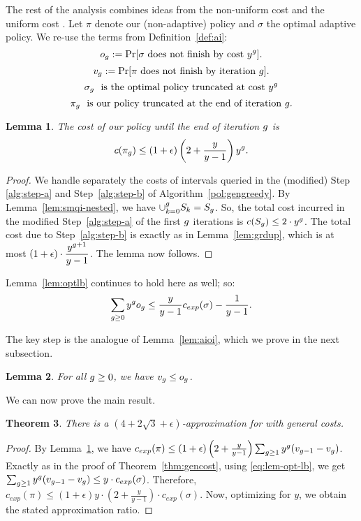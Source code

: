 \documentclass[11pt]{article}
\newcommand{\base}{y}
\newtheorem{thm}{Theorem}[section]
\newtheorem{lem}[thm]{Lemma}
\theoremstyle{remark}
\theoremstyle{plain}
\theoremstyle{remark}
\begin{document}
The rest of the analysis combines ideas from the non-uniform cost \smq and the uniform cost \smqi. Let $\pi$ denote our (non-adaptive) policy and $\sigma$ the optimal adaptive policy. We re-use the terms from Definition~\ref{def:ai}: 
  \[ o_\i := \Pr[ \sigma \text{ does not finish by cost }\base^\i] . \]
    \[ v_g := \Pr[\pi \text{ does not finish by iteration }g] .\]
    \[\sigma_\i \,\,  \text{ is the optimal policy truncated at cost }\base^\i\]
    \[\pi_g \,\,  \text{ is our policy truncated at the end of iteration  } g.\]

    
\begin{lem}
\label{lem:smqi-cost-i}The cost of our policy until the end of iteration $g$  is
   \[c(\pi_\i)  \leq (1 + \epsilon) \left(2 + \dfrac{\base}{\base - 1}  \right)\base^\i. \]
\end{lem}
\begin{proof}
We handle separately the costs of intervals queried in the (modified) Step \ref{alg:step-a}   and Step~\ref{alg:step-b} of Algorithm~\ref{pol:gengreedy}. By Lemma~\ref{lem:smqi-nested}, we have $\cup_{k=0}^g S_k =S_g$. So,  the total cost incurred in the modified Step~\ref{alg:step-a} of the first $g$ iterations is $c(\t_\i)\le 2\cdot \base^\i$. The total cost due to Step~\ref{alg:step-b} is exactly as in Lemma~\ref{lem:grdup}, which is at most $ (1 + \epsilon) \cdot \dfrac{\base^{\i+1}}{\base - 1}$.   The lemma now follows. 
\end{proof}
Lemma~\ref{lem:optlb} continues to hold here as well; so:
\begin{equation}
    \label{eq:lem-opt-lb}
    \sum_{\i\ge 0} {\base^\i o_\i} \leq  \frac{\base }{\base-1} c_{exp}(\sigma) - \frac1{y-1}. 
\end{equation}

The key step is the analogue of Lemma~\ref{lem:aioi}, which we prove in the next subsection.
 \begin{lem} For all $g \ge 0$, we have $v_g \le o_g$. 
 \label{lem:smqi-comp-prob}
 \end{lem}

We can now prove the main result. 
\begin{thm}
      There is a $( 4+ 2\sqrt{3} + \epsilon)$-approximation for \smqi  with general costs.  

\end{thm}
\begin{proof} By Lemma~\ref{lem:smqi-cost-i}, we have   $c_{exp}(\pi)  \leq (1 + \epsilon)  \left(2+ \frac{\base}{\base-1}  \right) \sum_{\i \ge 1}{{\base}^\i(v_{\i-1} - v_\i)}$. Exactly as in the proof of Theorem~\ref{thm:gencost}, using \eqref{eq:lem-opt-lb}, we get
$\sum_{\i \ge 1} {{\base}^\i(v_{\i-1} - v_\i)} \le y\cdot c_{exp}(\sigma)$. Therefore, $c_{exp}(\pi)  \leq (1 + \epsilon)  y\cdot \left(2+ \frac{\base}{\base-1}   \right) \cdot  c_{exp}(\sigma)$. Now, optimizing for $y$, we obtain the stated approximation ratio.
\end{proof}
\end{document}
